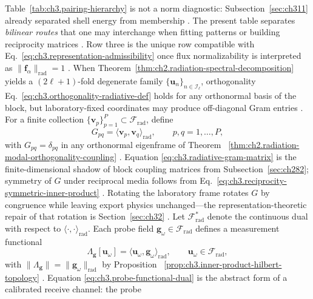 Table~\ref{tab:ch3.pairing-hierarchy} is not a norm diagnostic: Subsection~\ref{sec:ch311} already separated
shell energy from membership \cite{stratton1941}. The present table separates \emph{bilinear routes} that
one may interchange when fitting patterns or building reciprocity matrices \cite{harrington2001}. Row three is
the unique row compatible with Eq.~\eqref{eq:ch3.representation-admissibility} once flux normalizability is
interpreted as \(\|\mathbf{f}_\alpha\|_{\mathrm{rad}}=1\) \cite{stratton1941}.
When Theorem~\ref{thm:ch2.radiation-spectral-decomposition} yields a \((2\ell+1)\)-fold degenerate family
\(\{\mathbf{u}_n\}_{n\in\mathcal{I}_\ell}\), orthogonality Eq.~\eqref{eq:ch3.orthogonality-radiative-def} holds
for any orthonormal basis of the block, but laboratory-fixed coordinates may produce off-diagonal Gram entries
\cite{jackson1999}. For a finite collection \(\{\mathbf{v}_p\}_{p=1}^{P}\subset\mathcal{F}_{\mathrm{rad}}\),
define
\begin{equation}
\label{eq:ch3.radiative-gram-matrix}
G_{pq}
=
\langle \mathbf{v}_p,\mathbf{v}_q\rangle_{\mathrm{rad}},
\qquad
p,q=1,\ldots,P,
\end{equation}
with \(G_{pq}=\delta_{pq}\) in any orthonormal eigenframe of Theorem
~\ref{thm:ch2.radiation-modal-orthogonality-coupling} \cite{stratton1941}. Equation
\eqref{eq:ch3.radiative-gram-matrix} is the finite-dimensional shadow of block coupling matrices from
Subsection~\ref{sec:ch282}; symmetry of \(G\) under reciprocal media follows from
Eq.~\eqref{eq:ch3.reciprocity-symmetric-inner-product} \cite{stratton1941}. Rotating the laboratory frame
rotates \(G\) by congruence while leaving export physics unchanged---the representation-theoretic repair of
that rotation is Section~\ref{sec:ch32} \cite{jackson1999}.
Let \(\mathcal{F}_{\mathrm{rad}}^{*}\) denote the continuous dual with respect to
\(\langle\cdot,\cdot\rangle_{\mathrm{rad}}\). Each probe field \(\mathbf{g}_\omega\in\mathcal{F}_{\mathrm{rad}}\)
defines a measurement functional
\begin{equation}
\label{eq:ch3.probe-functional-dual}
\Lambda_{\mathbf{g}}[\mathbf{u}_\omega]
=
\langle \mathbf{u}_\omega,\mathbf{g}_\omega\rangle_{\mathrm{rad}},
\qquad
\mathbf{u}_\omega\in\mathcal{F}_{\mathrm{rad}},
\end{equation}
with \(\|\Lambda_{\mathbf{g}}\|=\|\mathbf{g}_\omega\|_{\mathrm{rad}}\) by Proposition
~\ref{prop:ch3.inner-product-hilbert-topology} \cite{stratton1941}. Equation
\eqref{eq:ch3.probe-functional-dual} is the abstract form of a calibrated receive channel: the probe
